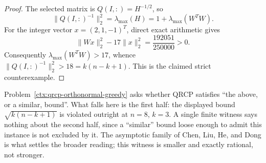 \begin{cxrefutation}
\begin{proof}
The selected matrix is $Q(I,:)=H^{-1/2}$, so
\[
 \|Q(I,:)^{-1}\|_2^2=\lambda_{\max}(H)
 =1+\lambda_{\max}(W^TW).
\]
For the integer vector $x=(2,1,-1)^T$, direct exact arithmetic gives
\[
 \|Wx\|_2^2-17\|x\|_2^2=\frac{192051}{250000}>0.
\]
Consequently $\lambda_{\max}(W^TW)>17$, whence
$\|Q(I,:)^{-1}\|_2^2>18=k(n-k+1)$.  This is the claimed strict
counterexample.
\end{proof}

\begin{remark}[Scope]
Problem~\ref{ctx:qrcp-orthonormal-greedy} asks whether QRCP satisfies ``the
above, or a similar, bound''.
What falls here is the first half: the displayed bound $\sqrt{k(n-k+1)}$ is
violated outright at $n=8$, $k=3$.  A single finite witness says nothing about
the second half, since a ``similar'' bound loose enough to admit this instance
is not excluded by it.  The asymptotic family of Chen, Liu, He, and Dong
\cite{ChenLiuHeDong2026} is what settles the broader reading; this witness is
smaller and exactly rational, not stronger.
\end{remark}
\end{cxrefutation}
